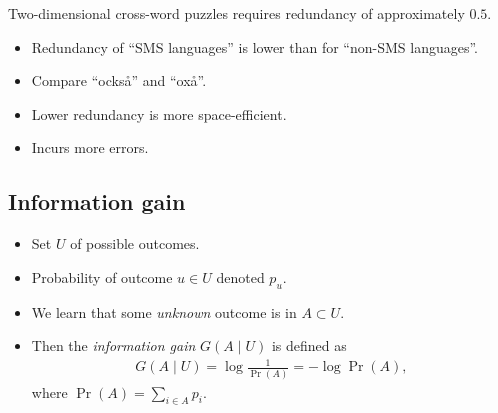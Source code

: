 \documentclass{beamer}
\begin{document}
\begin{frame}
  \begin{example}
    Two-dimensional cross-word puzzles requires redundancy of approximately 
    \(0.5\).
  \end{example}

  \begin{example}
    \begin{itemize}
      \item Redundancy of \enquote{SMS languages} is lower than for 
        \enquote{non-SMS languages}.

      \item Compare \enquote{också} and \enquote{oxå}.

    \end{itemize}
  \end{example}

  \begin{remark}
    \begin{itemize}
      \item Lower redundancy is more space-efficient.
      \item Incurs more errors.
    \end{itemize}
  \end{remark}
\end{frame}

%
%
%

\subsection{Information gain}

\begin{frame}
  \begin{definition}
    \begin{itemize}
      \item Set \(U\) of possible outcomes.
      \item Probability of outcome \(u\in U\) denoted \(p_u\).
      \item We learn that some \emph{unknown} outcome is in \(A\subset U\).
      \item Then the \emph{information gain} \(G(A\mid U)\) is defined as
        \begin{align*}
          G(A\mid U) = \log\frac{1}{\Pr(A)} = -\log\Pr(A),
        \end{align*}
        where \(\Pr(A) = \sum_{i\in A} p_i\).
    \end{itemize}
  \end{definition}
\end{frame}
\end{document}
